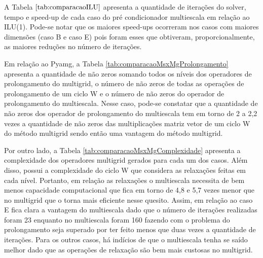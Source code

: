 A Tabela $\ref{tab:comparacaoILU}$ apresenta a quantidade de iterações do solver, tempo e speed-up de cada caso do pré condicionador multiescala em relação ao ILU(1). Pode-se notar que os maiores speed-ups ocorreram nos casos com maiores dimensões (caso B e caso E) pois foram esses que obtiveram, proporcionalmente, as maiores reduções no número de iterações.

Em relação ao Pyamg, a Tabela \ref{tab:comparacaoMsxMgProlongamento} apresenta a quantidade de não zeros somando todos os níveis dos operadores de prolongamento do multigrid, o número de não zeros de todas as operações de prolongamento de um ciclo W e o número de não zeros do operador de prolongamento do multiescala. Nesse caso, pode-se constatar que a quantidade de não zeros dos operador de prolongamento do multiescala tem em torno de 2 a 2,2 vezes a quantidade de não zeros das multiplicações matriz vetor de um ciclo W do método multigrid sendo então uma vantagem do método multigrid.

Por outro lado, a Tabela \ref{tab:comparacaoMsxMgComplexidade} apresenta a complexidade dos operadores multigrid gerados para cada um dos casos. Além disso, possui a complexidade do ciclo W que considera as relaxações feitas em cada nível. Portanto, em relação as relaxações o multiescala necessita de bem menos capacidade computacional que fica em torno de 4,8 e 5,7 vezes menor que no multigrid que o torna mais eficiente nesse quesito. 
Assim, em relação ao caso E fica clara a vantagem do multiescala dado que o número de iterações realizadas foram 23 enquanto no multiescala foram 160 fazendo com o problema do prolongamento seja superado por ter feito menos que duas vezes a quantidade de iterações. Para os outros casos, há indícios de que o multiescala tenha se saído melhor dado que as operações de relaxação são bem mais custosas no multigrid.

